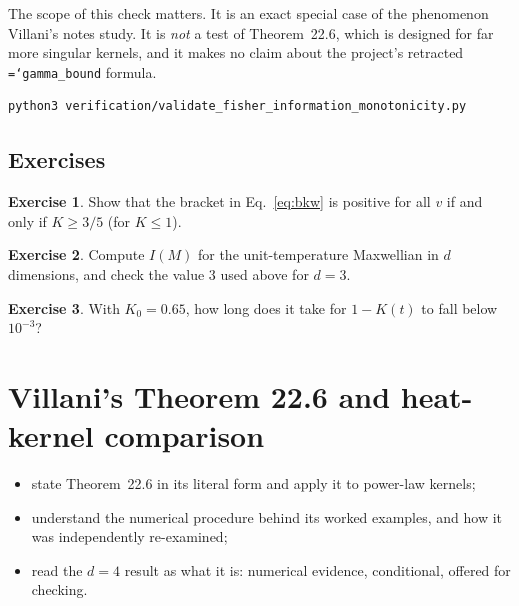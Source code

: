 \documentclass[11pt,a4paper,openany]{book}
\newcommand{\code}[1]{\texttt{\hyphenchar\font=`\-\relax #1}}
\theoremstyle{definition}
\newtheorem{exercise}{Exercise}[chapter]
\theoremstyle{plain}
\begin{document}
The scope of this check matters. It is an exact special case of the phenomenon Villani's notes
study. It is \emph{not} a test of Theorem~22.6, which is designed for far more singular kernels,
and it makes no claim about the project's retracted \code{gamma\_bound} formula.

\begin{runit}
\begin{verbatim}
python3 verification/validate_fisher_information_monotonicity.py
\end{verbatim}
\end{runit}

\section*{Exercises}
\begin{exercise}\label{ex:bkwpos}
Show that the bracket in Eq.~\eqref{eq:bkw} is positive for all $v$ if and only if $K\ge3/5$
(for $K\le1$).
\end{exercise}
\begin{exercise}\label{ex:fisherM}
Compute $I(M)$ for the unit-temperature Maxwellian in $d$ dimensions, and check the value $3$ used
above for $d=3$.
\end{exercise}
\begin{exercise}\label{ex:bkwtime}
With $K_0=0.65$, how long does it take for $1-K(t)$ to fall below $10^{-3}$?
\end{exercise}

\chapter{Villani's Theorem 22.6 and heat-kernel comparison}
\label{ch:villani}

\begin{objectives}
\begin{itemize}
  \item state Theorem~22.6 in its literal form and apply it to power-law kernels;
  \item understand the numerical procedure behind its worked examples, and how it was
        independently re-examined;
  \item read the $d=4$ result as what it is: numerical evidence, conditional, offered for checking.
\end{itemize}
\end{objectives}
\end{document}
